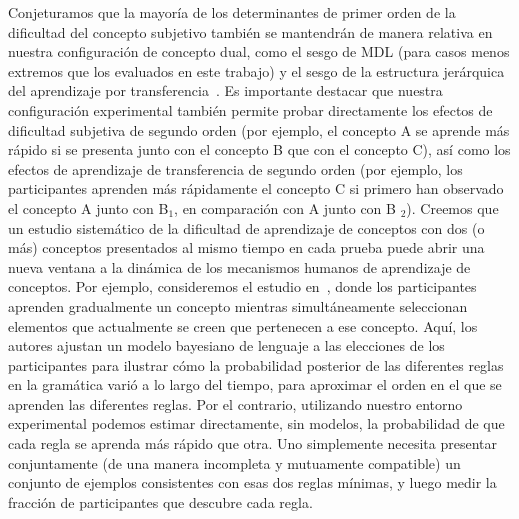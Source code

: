 Conjeturamos que la mayoría de los determinantes de primer orden de la dificultad del concepto subjetivo también se mantendrán de manera relativa en nuestra configuración de concepto dual, como el sesgo de MDL (para casos menos extremos que los evaluados en este trabajo)\cite{feldman2003simplicity} y el sesgo de la estructura jerárquica del aprendizaje por transferencia~\cite{tano2020towards}. Es importante destacar que nuestra configuración experimental también permite probar directamente los efectos de dificultad subjetiva de segundo orden (por ejemplo, el concepto A se aprende más rápido si se presenta junto con el concepto B que con el concepto C), así como los efectos de aprendizaje de transferencia de segundo orden (por ejemplo, los participantes aprenden más rápidamente el concepto C si primero han observado el concepto A junto con B$_1 $, en comparación con A junto con B $_2$). Creemos que un estudio sistemático de la dificultad de aprendizaje de conceptos con dos (o más) conceptos presentados al mismo tiempo en cada prueba puede abrir una nueva ventana a la dinámica de los mecanismos humanos de aprendizaje de conceptos. Por ejemplo, consideremos el estudio en~\cite{piantadosi2016logical}, donde los participantes aprenden gradualmente un concepto mientras simultáneamente seleccionan elementos que actualmente se creen que pertenecen a ese concepto. Aquí, los autores ajustan un modelo bayesiano de lenguaje a las elecciones de los participantes para ilustrar cómo la probabilidad posterior de las diferentes reglas en la gramática varió a lo largo del tiempo, para aproximar el orden en el que se aprenden las diferentes reglas. Por el contrario, utilizando nuestro entorno experimental podemos estimar directamente, sin modelos, la probabilidad de que cada regla se aprenda más rápido que otra. Uno simplemente necesita presentar conjuntamente (de una manera incompleta y mutuamente compatible) un conjunto de ejemplos consistentes con esas dos reglas mínimas, y luego medir la fracción de participantes que descubre cada regla.


